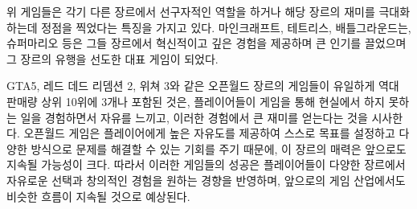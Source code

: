 \documentclass[a4paper, 11pt]{article}
\begin{document}
위 게임들은 각기 다른 장르에서 선구자적인 역할을 하거나 해당 장르의 재미를 극대화하는데 정점을 찍었다는 특징을 가지고 있다. 마인크래프트, 테트리스, 배틀그라운드는, 슈퍼마리오 등은 그들 장르에서 혁신적이고 깊은 경험을 제공하며 큰 인기를 끌었으며 그 장르의 유행을 선도한 대표 게임이 되었다. 

GTA5, 레드 데드 리뎀션 2, 위쳐 3와 같은 오픈월드 장르의 게임들이 유일하게 역대 판매량 상위 10위에 3개나 포함된 것은, 플레이어들이 게임을 통해 현실에서 하지 못하는 일을 경험하면서 자유를 느끼고, 이러한 경험에서 큰 재미를 얻는다는 것을 시사한다. 오픈월드 게임은 플레이어에게 높은 자유도를 제공하여 스스로 목표를 설정하고 다양한 방식으로 문제를 해결할 수 있는 기회를 주기 때문에, 이 장르의 매력은 앞으로도 지속될 가능성이 크다. 따라서 이러한 게임들의 성공은 플레이어들이 다양한 장르에서 자유로운 선택과 창의적인 경험을 원하는 경향을 반영하며, 앞으로의 게임 산업에서도 비슷한 흐름이 지속될 것으로 예상된다.
\end{document}
